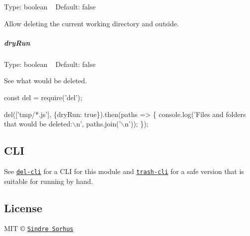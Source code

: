 Type\+: {\ttfamily boolean} ~\newline
Default\+: {\ttfamily false}

Allow deleting the current working directory and outside.

\subparagraph*{dry\+Run}

Type\+: {\ttfamily boolean} ~\newline
Default\+: {\ttfamily false}

See what would be deleted.


\begin{DoxyCode}
const del = require('del');

del(['tmp/*.js'], \{dryRun: true\}).then(paths => \{
    console.log('Files and folders that would be deleted:\(\backslash\)n', paths.join('\(\backslash\)n'));
\});
\end{DoxyCode}


\subsection*{C\+LI}

See \href{https://github.com/sindresorhus/del-cli}{\tt del-\/cli} for a C\+LI for this module and \href{https://github.com/sindresorhus/trash-cli}{\tt trash-\/cli} for a safe version that is suitable for running by hand.

\subsection*{License}

M\+IT © \href{http://sindresorhus.com}{\tt Sindre Sorhus} 